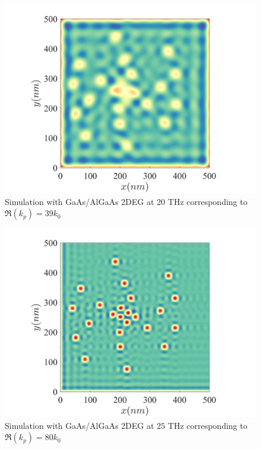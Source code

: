 \documentclass[11pt]{article}
\begin{document}
\begin{figure}[h!]
  \centering
  \includegraphics[scale=1]{free_space_sim.png}
  \caption{Simulation with GaAs/AlGaAs 2DEG at $20$ THz corresponding to $\Re(k_p) = 39 k_0$}
  \label{fig:sim_low}
\end{figure}

\begin{figure}[h!]
  \centering
  \includegraphics[scale=1]{plasmonic_sim.png}
  \caption{Simulation with GaAs/AlGaAs 2DEG at $25$ THz corresponding to $\Re(k_p) = 80 k_0$}
  \label{fig:plasmonic_sim}
\end{figure}

\clearpage %


\end{document}
